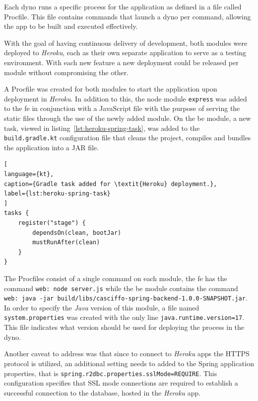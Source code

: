 Each dyno runs a specific process for the application as defined in a file called Procfile. This file contains commands that launch a dyno per command, allowing the app to be built and executed effectively.

With the goal of having continuous delivery of development, both modules were deployed to \textit{Heroku}, each as their own separate application to serve as a testing environment.
With each new feature a new deployment could be released per module without compromising the other. 

A Procfile was created for both modules to start the application upon deployment in \textit{Heroku}. In addition to this, the node module \lstinline{express} was added to the \acrshort{fe} in conjunction with a JavaScript file with the purpose of serving the static files through the use of the newly added module. On the \acrshort{be} module, a new task, viewed in listing~\ref{lst:heroku-spring-task}, was added to the \lstinline{build.gradle.kt} configuration file that cleans the project, compiles and bundles the application into a JAR file. 

\begin{lstlisting}[
language={kt},
caption={Gradle task added for \textit{Heroku} deployment.},
label={lst:heroku-spring-task}
]
tasks {
    register("stage") {
        dependsOn(clean, bootJar)
        mustRunAfter(clean)
    }
}
\end{lstlisting}


The Procfiles consist of a single command on each module, the \acrshort{fe} has the command \lstinline{web: node server.js} while the \acrshort{be} module contains the command \lstinline[keywordstyle=\color{black},commentstyle=\color{black},stringstyle=\color{black}]{web: java -jar build/libs/casciffo-spring-backend-1.0.0-SNAPSHOT.jar}. In order to specify the \textit{Java} version of this module, a file named \lstinline{system.properties} was created with the only line \lstinline{java.runtime.version=17}. This file indicates what version should be used for deploying the process in the dyno.

Another caveat to address was that since to connect to \textit{Heroku} apps the HTTPS protocol is utilized, an additional setting needs to added to the Spring application properties, that is \lstinline{spring.r2dbc.properties.sslMode=REQUIRE}. This configuration specifies that SSL mode connections are required to establish a successful connection to the database, hosted in the \textit{Heroku} app. 

